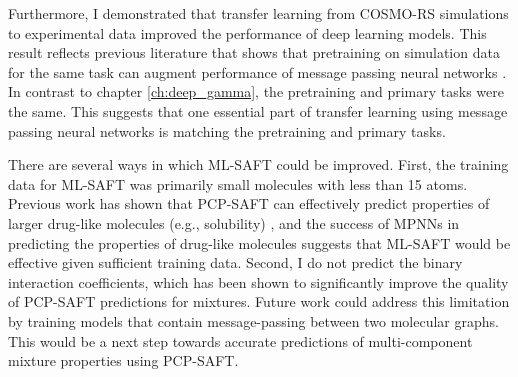 Furthermore, I demonstrated that transfer learning from COSMO-RS simulations to experimental data improved the performance of deep learning models. This result reflects previous literature that shows that pretraining on simulation data for the same task can augment performance of message passing neural networks \cite{Vermeire2021}. In contrast to chapter \ref{ch:deep_gamma}, the pretraining and primary tasks were the  same. This suggests that one essential part of transfer learning using message passing neural networks is matching the pretraining and primary tasks.

There are several ways in which ML-SAFT could be improved. First, the training data for ML-SAFT was primarily small molecules with less than 15 atoms. Previous work has shown that PCP-SAFT can effectively predict properties of larger drug-like molecules (e.g., solubility) \cite{Klajmon2020}, and the success of MPNNs in predicting the properties of drug-like molecules suggests that ML-SAFT would be effective given sufficient training data. Second, I do not predict the binary interaction coefficients, which has been shown to significantly improve the quality of PCP-SAFT predictions for mixtures. Future work could address this limitation by training models that contain message-passing between two molecular graphs. This would be a next step towards accurate predictions of multi-component mixture properties using PCP-SAFT.


